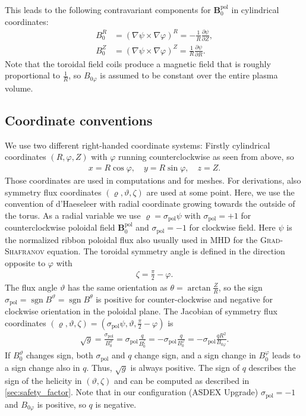 \documentclass[a4paper, 10pt, english]{article}
\let\temp\varrho
\let\varrho\rho
\let\rho\temp
\let\temp\vartheta
\let\vartheta\theta
\let\theta\temp
\let\temp\varphi
\let\varphi\phi
\let\phi\temp
\let\vec\symbf
\newcommand*\pd[2][]{\ensuremath{\frac{\partial #1}{\partial #2}}}  %
\newcommand*\pol{\ensuremath{\textrm{pol}}}  %
\DeclareMathOperator\sgn{sgn}
\begin{document}
This leads to the following contravariant components for $\vec{B}_{0}^{\pol}$ in cylindrical coordinates:
\begin{align}
  B_{0}^{R} &= (\nabla \psi \times \nabla \phi)^{R} = -\frac{1}{R} \pd[\psi]{Z}, \\
  B_{0}^{Z} &= (\nabla \psi \times \nabla \phi)^{Z} = \frac{1}{R} \pd[\psi]{R}.
\end{align}
Note that the toroidal field coils produce a magnetic field that is roughly proportional to $\frac{1}{R}$, so $B_{0 \phi}$ is assumed to be constant over the entire plasma volume.

\subsection{Coordinate conventions}
\label{sec:cocos}

We use two different right-handed coordinate systems: Firstly cylindrical coordinates $(R, \phi, Z)$ with $\phi$ running counterclockwise as seen from above, so
\begin{gather*}
  x = R \cos \phi, \quad y = R \sin \phi, \quad z = Z.
\end{gather*}
Those coordinates are used in computations and for meshes. For derivations, also symmetry flux coordinates $(\rho, \theta, \zeta)$ are used at some point. Here, we use the convention of d'Haeseleer with radial coordinate growing towards the outside of the torus. As a radial variable we use $\rho = \sigma_{\pol} \psi$ with $\sigma_{\pol} = +1$ for counterclockwise poloidal field $\vec{B}_{0}^{\pol}$ and $\sigma_{\pol} = -1$ for clockwise field. Here $\psi$ is the normalized ribbon poloidal flux also usually used in MHD for the \textsc{Grad}-\textsc{Shafranov} equation. The toroidal symmetry angle is defined in the direction opposite to $\phi$ with
\begin{gather*}
  \zeta = \frac{\pi}{2} - \phi.
\end{gather*}
The flux angle $\theta$ has the same orientation as $\vartheta = \arctan \frac{Z}{R}$, so the sign $\sigma_{\pol} = \sgn B^{\theta} = \sgn B^{\vartheta}$ is positive for counter-clockwise and negative for clockwise orientation in the poloidal plane. The Jacobian of symmetry flux coordinates $(\rho, \theta, \zeta) = (\sigma_{\pol} \psi, \theta, \frac{\pi}{2} - \phi)$ is
\begin{gather}
  \sqrt{g} = \frac{\sigma_{\pol}}{B_{0}^{\theta}} = \sigma_{\pol} \frac{q}{B_{0}^{\zeta}} = -\sigma_{\pol} \frac{q}{B_{0}^{\phi}} = -\sigma_{\pol} \frac{q R^{2}}{B_{0 \phi}}.
\end{gather}
If $B_{0}^{\theta}$ changes sign, both $\sigma_{\pol}$ and $q$ change sign, and a sign change in $B_{0}^{\phi}$ leads to a sign change also in $q$. Thus, $\sqrt{g}$ is always positive. The sign of $q$ describes the sign of the helicity in $(\theta, \zeta)$ and can be computed as described in \cref{sec:safety_factor}. Note that in our configuration (ASDEX Upgrade) $\sigma_{\pol} = -1$ and $B_{0 \phi}$ is positive, so $q$ is negative.
\end{document}

